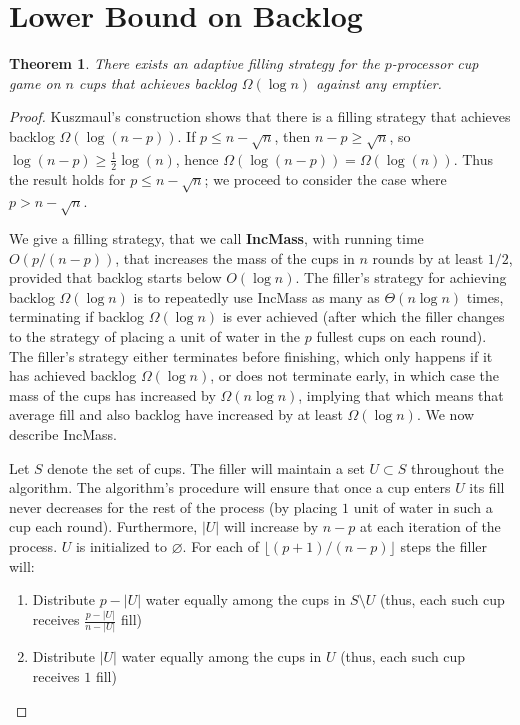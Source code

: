 \documentclass[twocolumn, 10pt]{article}
\newtheorem{theorem}{Theorem}
\begin{document}
\section{Lower Bound on Backlog}
\begin{theorem}
  There exists an adaptive filling strategy for the $p$-processor
  cup game on $n$ cups that achieves backlog $\Omega(\log n)$
  against any emptier.
\end{theorem}
\begin{proof}
Kuszmaul's construction shows that there is a filling strategy
that achieves backlog $\Omega(\log (n-p))$.  If $p \le n -
\sqrt{n}$, then $n-p \ge \sqrt{n}$, so $\log (n-p) \ge
\frac{1}{2}\log (n)$, hence $\Omega(\log(n-p)) =
\Omega(\log(n))$. Thus the result holds for $p \le n - \sqrt{n}$;
we proceed to consider the case where $p > n-\sqrt{n}$.

We give a filling strategy, that we call \textbf{IncMass}, with
running time $O(p/(n-p))$, that increases the mass of the cups in
$n$ rounds by at least $1/2$, provided that backlog starts below
$O(\log n)$. The filler's strategy for achieving backlog
$\Omega(\log n)$ is to repeatedly use IncMass as many as
$\Theta(n\log n)$ times, terminating if backlog $\Omega(\log n)$
is ever achieved (after which the filler changes to the strategy
of placing a unit of water in the $p$ fullest cups on each
round). The filler's strategy either terminates before finishing,
which only happens if it has achieved backlog $\Omega(\log n)$,
or does not terminate early, in which case the mass of the cups
has increased by $\Omega(n\log n)$, implying that which means
that average fill and also backlog have increased by at least
$\Omega(\log n)$. We now describe IncMass.

Let $S$ denote the set of cups. The filler will maintain a set $U
\subset S$ throughout the algorithm. The algorithm's procedure
will ensure that once a cup enters $U$ its fill never decreases
for the rest of the process (by placing $1$ unit of water in such
a cup each round). Furthermore, $|U|$ will increase by $n-p$ at
each iteration of the process. $U$ is initialized to $\varnothing$.
For each of $\lfloor(p+1) / (n-p)\rfloor$ steps the filler will:
\begin{enumerate}
  \item Distribute $p - |U|$ water equally among the cups in
    $S\setminus U$ (thus, each such cup receives
    $\frac{p-|U|}{n-|U|}$ fill)
  \item Distribute $|U|$ water equally among the cups in $U$
    (thus, each such cup receives $1$ fill)
\end{enumerate}


\end{proof}
\end{document}

